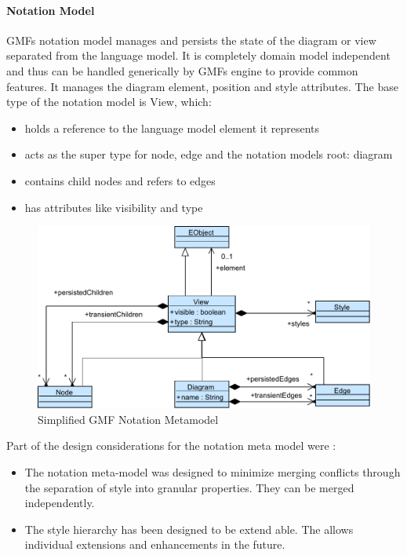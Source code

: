 \paragraph{Notation Model}
GMFs notation model manages and persists the state of the diagram or view separated from the language model. It is completely domain model independent and thus can be handled generically by GMFs engine to provide common features. It manages the diagram element, position and style attributes. \cite{EMP} The base type of the notation model is View, which:
\begin{itemize}
	\item holds a reference to the language model element it represents 
	\item acts as the super type for node, edge and the notation models root: diagram
	\item contains child nodes and refers to edges
	\item has attributes like visibility and type
\end{itemize}

\begin{figure}
\centering
\includegraphics[scale=0.8]{gfx/ex/GMF_Notation} 
\caption{Simplified GMF Notation Metamodel}
\label{MM:GMF}
\end{figure}

Part of the design considerations for the notation meta model were \cite{GMFDoc}:
\begin{itemize}
	\item The notation meta-model was designed to minimize merging conflicts through the separation of style into granular properties. They can be merged independently.
	\item The style hierarchy has been designed to be extend able. The allows individual extensions and enhancements in the future. 
\end{itemize}

